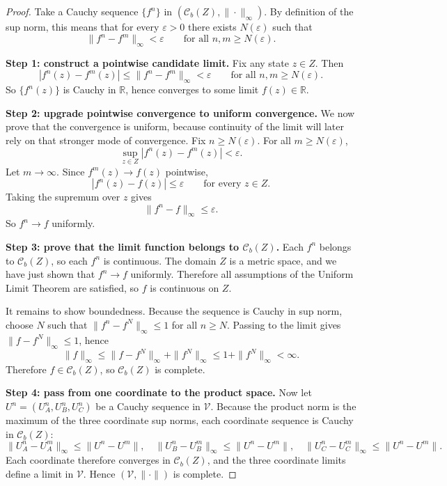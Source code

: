 \begin{proof}
Take a Cauchy sequence $\{f^n\}$ in $(\mathcal C_b(Z),\|\cdot\|_\infty)$. By definition of the sup norm, this means that for every $\varepsilon>0$ there exists $N(\varepsilon)$ such that
\[
\|f^n-f^m\|_\infty<\varepsilon
\qquad\text{for all }n,m\ge N(\varepsilon).
\]

\medskip\noindent\textbf{Step 1: construct a pointwise candidate limit.}
Fix any state $z\in Z$. Then
\[
|f^n(z)-f^m(z)|\le \|f^n-f^m\|_\infty<\varepsilon
\qquad\text{for all }n,m\ge N(\varepsilon).
\]
So $\{f^n(z)\}$ is Cauchy in $\mathbb R$, hence converges to some limit $f(z)\in\mathbb R$.

\medskip\noindent\textbf{Step 2: upgrade pointwise convergence to uniform convergence.}
We now prove that the convergence is uniform, because continuity of the limit will later rely on that stronger mode of convergence. Fix $n\ge N(\varepsilon)$. For all $m\ge N(\varepsilon)$,
\[
\sup_{z\in Z}|f^n(z)-f^m(z)|<\varepsilon.
\]
Let $m\to\infty$. Since $f^m(z)\to f(z)$ pointwise,
\[
|f^n(z)-f(z)|\le\varepsilon\qquad\text{for every }z\in Z.
\]
Taking the supremum over $z$ gives
\[
\|f^n-f\|_\infty\le \varepsilon.
\]
So $f^n\to f$ uniformly.

\medskip\noindent\textbf{Step 3: prove that the limit function belongs to $\mathcal C_b(Z)$.}
Each $f^n$ belongs to $\mathcal C_b(Z)$, so each $f^n$ is continuous. The domain $Z$ is a metric space, and we have just shown that $f^n\to f$ uniformly. Therefore all assumptions of the Uniform Limit Theorem are satisfied, so $f$ is continuous on $Z$.

It remains to show boundedness. Because the sequence is Cauchy in sup norm, choose $N$ such that $\|f^n-f^N\|_\infty\le 1$ for all $n\ge N$. Passing to the limit gives $\|f-f^N\|_\infty\le 1$, hence
\[
\|f\|_\infty\le \|f-f^N\|_\infty+\|f^N\|_\infty\le 1+\|f^N\|_\infty<\infty.
\]
Therefore $f\in\mathcal C_b(Z)$, so $\mathcal C_b(Z)$ is complete.

\medskip\noindent\textbf{Step 4: pass from one coordinate to the product space.}
Now let $U^n=(U_A^n,U_B^n,U_C^n)$ be a Cauchy sequence in $\mathcal V$. Because the product norm is the maximum of the three coordinate sup norms, each coordinate sequence is Cauchy in $\mathcal C_b(Z)$:
\[
\|U_A^n-U_A^m\|_\infty\le \|U^n-U^m\|,
\quad
\|U_B^n-U_B^m\|_\infty\le \|U^n-U^m\|,
\quad
\|U_C^n-U_C^m\|_\infty\le \|U^n-U^m\|.
\]
Each coordinate therefore converges in $\mathcal C_b(Z)$, and the three coordinate limits define a limit in $\mathcal V$. Hence $(\mathcal V,\|\cdot\|)$ is complete.
\end{proof}

